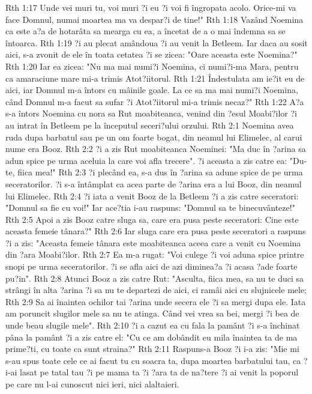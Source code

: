 Rth 1:17  Unde vei muri tu, voi muri ?i eu ?i voi fi îngropata acolo. Orice-mi va face Domnul, numai moartea ma va despar?i de tine!"
Rth 1:18  Vazând Noemina ca este a?a de hotarâta sa mearga cu ea, a încetat de a o mai îndemna sa se întoarca.
Rth 1:19  ?i au plecat amândoua ?i au venit la Betleem. Iar daca au sosit aici, s-a zvonit de ele în toata cetatea ?i se zicea: "Oare aceasta este Noemina?"
Rth 1:20  Iar ea zicea: "Nu ma mai numi?i Noemina, ci numi?i-ma Mara, pentru ca amaraciune mare mi-a trimis Atot?iitorul.
Rth 1:21  Îndestulata am ie?it eu de aici, iar Domnul m-a întors cu mâinile goale. La ce sa ma mai numi?i Noemina, când Domnul m-a facut sa sufar ?i Atot?iitorul mi-a trimis necaz?"
Rth 1:22  A?a s-a întors Noemina cu nora sa Rut moabiteanca, venind din ?esul Moabi?ilor ?i au intrat în Betleem pe la începutul seceri?ului orzului.
Rth 2:1  Noemina avea ruda dupa barbatul sau pe un om foarte bogat, din neamul lui Elimelec, al carui nume era Booz.
Rth 2:2  ?i a zis Rut moabiteanca Noeminei: "Ma duc în ?arina sa adun spice pe urma aceluia la care voi afla trecere". ?i aceasta a zis catre ea: "Du-te, fiica mea!"
Rth 2:3  ?i plecând ea, s-a dus în ?arina sa adune spice de pe urma seceratorilor. ?i s-a întâmplat ca acea parte de ?arina era a lui Booz, din neamul lui Elimelec.
Rth 2:4  ?i iata a venit Booz de la Betleem ?i a zis catre seceratori: "Domnul sa fie cu voi!" Iar ace?tia i-au raspuns: "Domnul sa te binecuvânteze!"
Rth 2:5  Apoi a zis Booz catre sluga sa, care era pusa peste seceratori: Cine este aceasta femeie tânara?"
Rth 2:6  Iar sluga care era pusa peste seceratori a raspuns ?i a zis: "Aceasta femeie tânara este moabiteanca aceea care a venit cu Noemina din ?ara Moabi?ilor.
Rth 2:7  Ea m-a rugat: "Voi culege ?i voi aduna spice printre snopi pe urma seceratorilor. ?i se afla aici de azi diminea?a ?i acasa ?ade foarte pu?in".
Rth 2:8  Atunci Booz a zis catre Rut: "Asculta, fiica mea, sa nu te duci sa strângi în alta ?arina ?i sa nu te departezi de aici, ci ramâi aici cu slujnicele mele;
Rth 2:9  Sa ai înaintea ochilor tai ?arina unde secera ele ?i sa mergi dupa ele. Iata am poruncit slugilor mele sa nu te atinga. Când vei vrea sa bei, mergi ?i bea de unde beau slugile mele".
Rth 2:10  ?i a cazut ea cu fala la pamânt ?i s-a închinat pâna la pamânt ?i a zis catre el: "Cu ce am dobândit eu mila înaintea ta de ma prime?ti, cu toate ca sunt straina?"
Rth 2:11  Raspuns-a Booz ?i i-a zis: "Mie mi s-au spus toate cele ce ai facut tu cu soacra ta, dupa moartea barbatului tau, ca ?i-ai lasat pe tatal tau ?i pe mama ta ?i ?ara ta de na?tere ?i ai venit la poporul pe care nu l-ai cunoscut nici ieri, nici alaltaieri.
